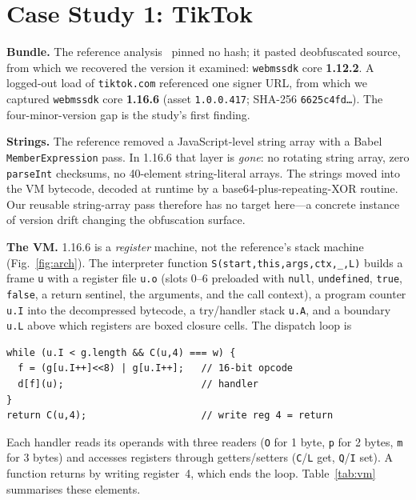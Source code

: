 \documentclass[conference,10pt]{IEEEtran}
\newcommand{\code}[1]{\texttt{\small #1}}
\begin{document}
\section{Case Study 1: TikTok}
\label{sec:tiktok}
\textbf{Bundle.} The reference analysis~\cite{tiktokref} pinned no hash; it pasted deobfuscated source, from which we recovered the version it examined: \code{webmssdk} core \textbf{1.12.2}. A logged-out load of \code{tiktok.com} referenced one signer URL, from which we captured \code{webmssdk} core \textbf{1.16.6} (asset \code{1.0.0.417}; SHA-256 \code{6625c4fd{\ldots}}). The four-minor-version gap is the study's first finding.

\textbf{Strings.} The reference removed a JavaScript-level string array with a Babel \code{MemberExpression} pass. In 1.16.6 that layer is \emph{gone}: no rotating string array, zero \code{parseInt} checksums, no 40-element string-literal arrays. The strings moved into the VM bytecode, decoded at runtime by a base64-plus-repeating-XOR routine. Our reusable string-array pass therefore has no target here---a concrete instance of version drift changing the obfuscation surface.

\textbf{The VM.} 1.16.6 is a \emph{register} machine, not the reference's stack machine (Fig.~\ref{fig:arch}). The interpreter function \code{S(start,this,args,ctx,\_,L)} builds a frame \code{u} with a register file \code{u.o} (slots 0--6 preloaded with \code{null}, \code{undefined}, \code{true}, \code{false}, a return sentinel, the arguments, and the call context), a program counter \code{u.I} into the decompressed bytecode, a try/handler stack \code{u.A}, and a boundary \code{u.L} above which registers are boxed closure cells. The dispatch loop is
\begin{lstlisting}
while (u.I < g.length && C(u,4) === w) {
  f = (g[u.I++]<<8) | g[u.I++];   // 16-bit opcode
  d[f](u);                        // handler
}
return C(u,4);                    // write reg 4 = return
\end{lstlisting}
Each handler reads its operands with three readers (\code{O} for 1 byte, \code{p} for 2 bytes, \code{m} for 3 bytes) and accesses registers through getters/setters (\code{C}/\code{L} get, \code{Q}/\code{I} set). A function returns by writing register~4, which ends the loop. Table~\ref{tab:vm} summarises these elements.
\end{document}
